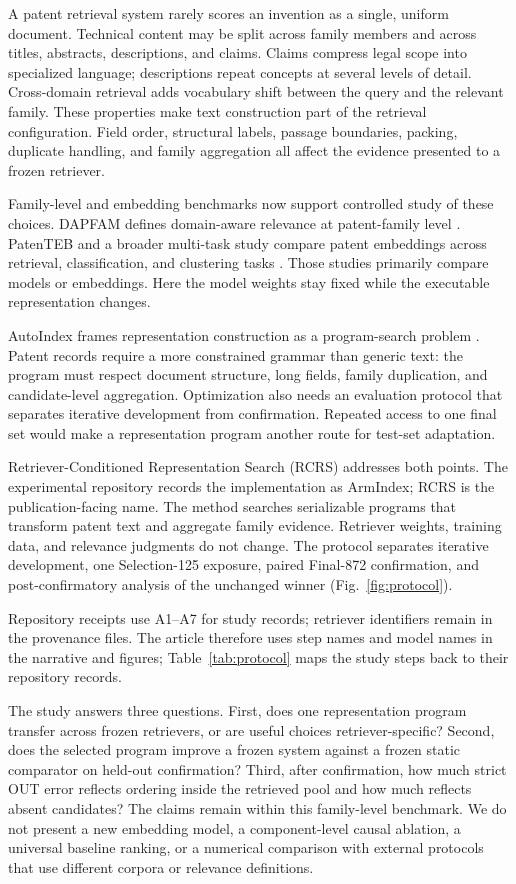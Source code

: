 \documentclass[final,5p,times,twocolumn]{elsarticle}
\newcommand{\RCRS}{RCRS}
\begin{document}
A patent retrieval system rarely scores an invention as a single, uniform
document. Technical content may be split across family members and across
titles, abstracts, descriptions, and claims. Claims compress legal scope into
specialized language; descriptions repeat concepts at several levels of
detail. Cross-domain retrieval adds vocabulary shift between the query and the
relevant family. These properties make text construction part of the retrieval
configuration. Field order, structural labels, passage boundaries, packing,
duplicate handling, and family aggregation all affect the evidence presented
to a frozen retriever.

Family-level and embedding benchmarks now support controlled study of these
choices. DAPFAM defines domain-aware relevance at patent-family level
\cite{dapfam2026}. PatenTEB and a broader multi-task study compare patent
embeddings across retrieval, classification, and clustering tasks
\cite{patenteb2025,patentembeddings2026}. Those studies primarily compare
models or embeddings. Here the model weights stay fixed while the executable
representation changes.

AutoIndex frames representation construction as a program-search problem
\cite{autoindex2026}. Patent records require a more constrained grammar than
generic text: the program must respect document structure, long fields,
family duplication, and candidate-level aggregation. Optimization also needs
an evaluation protocol that separates iterative development from confirmation.
Repeated access to one final set would make a representation program another
route for test-set adaptation.

Retriever-Conditioned Representation Search (\RCRS{}) addresses both points.
The experimental repository records the implementation as ArmIndex; \RCRS{}
is the publication-facing name. The method searches serializable
programs that transform patent text and aggregate family evidence. Retriever
weights, training data, and relevance judgments do not change. The protocol
separates iterative development, one Selection-125 exposure, paired Final-872
confirmation, and post-confirmatory analysis of the unchanged winner
(Fig.~\ref{fig:protocol}).

Repository receipts use A1--A7 for study records; retriever identifiers remain
in the provenance files. The article therefore uses step names and model names
in the narrative and figures; Table~\ref{tab:protocol} maps the study steps back
to their repository records.

The study answers three questions. First, does one representation program
transfer across frozen retrievers, or are useful choices retriever-specific?
Second, does the selected program improve a frozen system against a frozen
static comparator on held-out confirmation? Third, after confirmation, how
much strict OUT error reflects ordering inside the retrieved pool and how much
reflects absent candidates? The claims remain within this family-level
benchmark. We do not present a new embedding model, a component-level causal
ablation, a universal baseline ranking, or a numerical comparison with
external protocols that use different corpora or relevance definitions.
\end{document}
